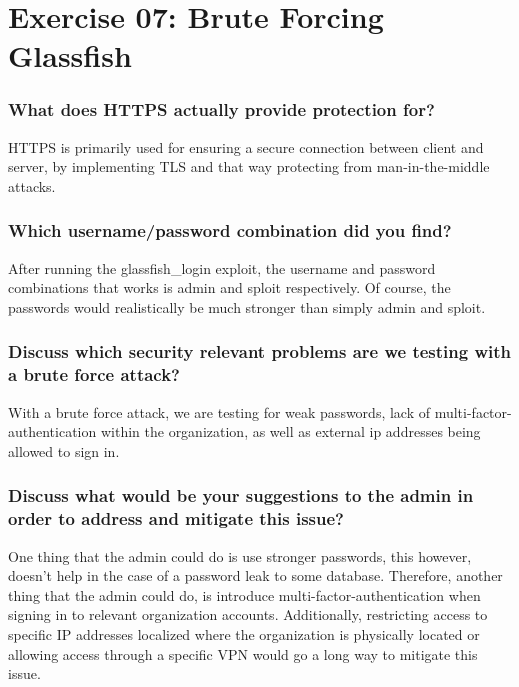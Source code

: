 \section{Exercise 07: Brute Forcing Glassfish}

\subsubsection{What does HTTPS actually provide protection for?}
HTTPS is primarily used for ensuring a secure connection between client and server, by implementing TLS and that way protecting from man-in-the-middle attacks.
\subsubsection{Which username/password combination did you find?}
After running the glassfish\_login exploit, the username and password combinations that works is admin and sploit respectively. Of course, the passwords would realistically be much stronger than simply admin and sploit.

\subsubsection{Discuss which security relevant problems are we
    testing with a brute force attack?}
With a brute force attack, we are testing for weak passwords, lack of multi-factor-authentication within the organization, as well as external ip addresses being allowed to sign in.
\subsubsection{Discuss what would be your suggestions to the admin
    in order to address and mitigate this issue?}
One thing that the admin could do is use stronger passwords, this however, doesn't help in the case of a password leak to some database. Therefore, another thing that the admin could do, is introduce multi-factor-authentication when signing in to relevant organization accounts. Additionally, restricting access to specific IP addresses localized where the organization is physically located or allowing access through a specific VPN would go a long way to mitigate this issue.
